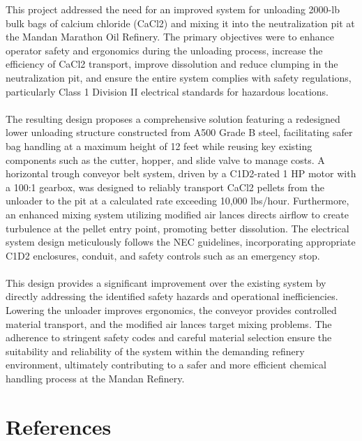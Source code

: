 \documentclass[10pt]{project}
\begin{document}
This project addressed the need for an improved system for unloading 2000-lb bulk bags of calcium chloride (CaCl2) and mixing it into the neutralization pit at the Mandan Marathon Oil Refinery. The primary objectives were to enhance operator safety and ergonomics during the unloading process, increase the efficiency of CaCl2 transport, improve dissolution and reduce clumping in the neutralization pit, and ensure the entire system complies with safety regulations, particularly Class 1 Division II electrical standards for hazardous locations.
\\\\
The resulting design proposes a comprehensive solution featuring a redesigned lower unloading structure constructed from A500 Grade B steel, facilitating safer bag handling at a maximum height of 12 feet while reusing key existing components such as the cutter, hopper, and slide valve to manage costs. A horizontal trough conveyor belt system, driven by a C1D2-rated 1 HP motor with a 100:1 gearbox, was designed to reliably transport CaCl2 pellets from the unloader to the pit at a calculated rate exceeding 10,000 lbs/hour. Furthermore, an enhanced mixing system utilizing modified air lances directs airflow to create turbulence at the pellet entry point, promoting better dissolution. The electrical system design meticulously follows the NEC guidelines, incorporating appropriate C1D2 enclosures, conduit, and safety controls such as an emergency stop.
\\\\
This design provides a significant improvement over the existing system by directly addressing the identified safety hazards and operational inefficiencies. Lowering the unloader improves ergonomics, the conveyor provides controlled material transport, and the modified air lances target mixing problems. The adherence to stringent safety codes and careful material selection ensure the suitability and reliability of the system within the demanding refinery environment, ultimately contributing to a safer and more efficient chemical handling process at the Mandan Refinery.

\section{References}

\let\seccs=\section
\renewcommand{\section}[2]{}%
\end{document}

